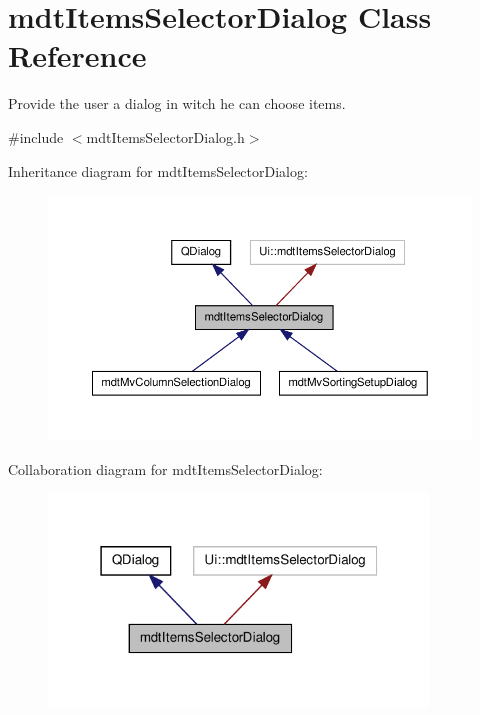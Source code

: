\hypertarget{classmdt_items_selector_dialog}{\section{mdt\-Items\-Selector\-Dialog Class Reference}
\label{classmdt_items_selector_dialog}
}


Provide the user a dialog in witch he can choose items.  




{\ttfamily \#include $<$mdt\-Items\-Selector\-Dialog.\-h$>$}



Inheritance diagram for mdt\-Items\-Selector\-Dialog\-:\nopagebreak
\begin{figure}[H]
\begin{center}
\leavevmode
\includegraphics[width=350pt]{classmdt_items_selector_dialog__inherit__graph}
\end{center}
\end{figure}


Collaboration diagram for mdt\-Items\-Selector\-Dialog\-:\nopagebreak
\begin{figure}[H]
\begin{center}
\leavevmode
\includegraphics[width=286pt]{classmdt_items_selector_dialog__coll__graph}
\end{center}
\end{figure}

